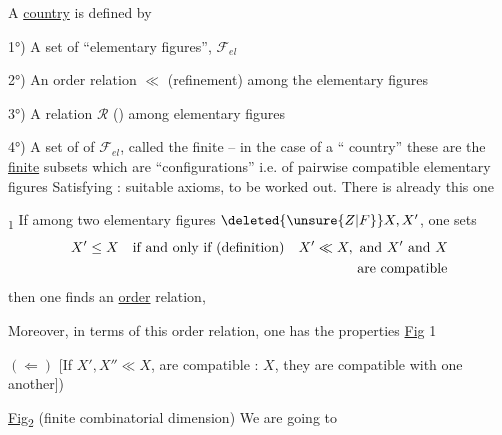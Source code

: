 A \uline{country} is defined by

1°) A set of ``elementary figures'', $\mathcal{F}_{el}$

2°) An order relation $\ll$  (refinement) among the elementary figures

3°) A   relation $\mathcal{R}$ () among elementary figures


4°) A set of  of $\mathcal{F}_{el}$, called the finite \unsure{---} -- in the case of a `` country'' these are the \uline{finite} subsets which are ``configurations''  i.e.  of pairwise compatible elementary figures
Satisfying : suitable axioms, to be worked out. There is already this one

\uline{}\textsubscript{1}  If among two elementary figures $\deleted{\unsure{Z|F}}X, X'$, one sets
\[
\begin{aligned}
X'\leq X\quad &\text{if and only if (definition)}\quad X'\ll X,\ \text{and }X'\text{ and }X\\
&\hphantom{\text{if and only if (definition)}\quad X'\ll X,\ }\text{are compatible}
\end{aligned}
\]
then one finds an \uline{order} relation,

Moreover, in terms of this order relation, one has the properties \uline{Fig} 1

\margin{$\vert\vert\vert$}
$(\Longleftarrow)$ [If $X', X''\ll X$,  are compatible : $X$, they are compatible with one another])

\uline{Fig}\textsubscript{2} (finite combinatorial dimension) We are going to

